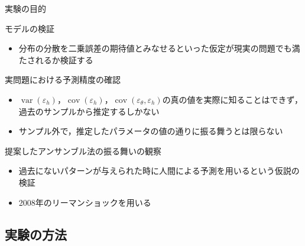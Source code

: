\documentclass[dvipdfmx,aspectratio=169]{beamer}
\DeclareMathOperator{\var}{var}
\DeclareMathOperator{\cov}{cov}
\newcommand{\varh}{\var(\varepsilon_h)}
\newcommand{\covh}{\cov(\varepsilon_h)}
\newcommand{\covmh}{\cov(\varepsilon_\theta, \varepsilon_h)}
\begin{document}
\begin{frame}{実験の目的}
\begin{block}{モデルの検証}
  \begin{itemize}
    \item 分布の分散を二乗誤差の期待値とみなせるといった仮定が現実の問題でも満たされるか検証する
  \end{itemize}
\end{block}
\begin{block}{実問題における予測精度の確認}
  \begin{itemize}
    \item $\varh$，$\covh$，$\covmh$の真の値を実際に知ることはできず，過去のサンプルから推定するしかない
    \item サンプル外で，推定したパラメータの値の通りに振る舞うとは限らない
  \end{itemize}
\end{block}
\begin{block}{提案したアンサンブル法の振る舞いの観察}
  \begin{itemize}
    \item 過去にないパターンが与えられた時に人間による予測を用いるという仮説の検証
    \item 2008年のリーマンショックを用いる
  \end{itemize}
\end{block}
\end{frame}

\subsection{実験の方法}
\end{document}
